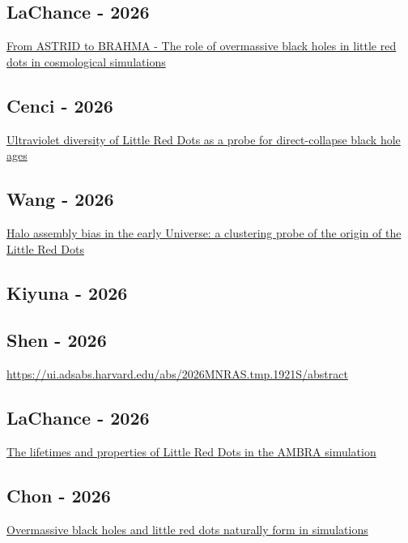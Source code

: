 \documentclass{article}
\begin{document}
\subsection*{LaChance - 2026}
\href{https://ui.adsabs.harvard.edu/abs/2026OJAp....973389L/abstract}{From ASTRID to BRAHMA - The role of overmassive black holes in little red dots in cosmological simulations}

\subsection*{Cenci - 2026}
\href{https://ui.adsabs.harvard.edu/abs/2026OJAp....972764C/abstract}{Ultraviolet diversity of Little Red Dots as a probe for direct-collapse black hole ages}

\subsection*{Wang - 2026}
\href{https://ui.adsabs.harvard.edu/abs/2026MNRAS.552g1712W/abstract}{Halo assembly bias in the early Universe: a clustering probe of the origin of the Little Red Dots}

\subsection*{Kiyuna - 2026}

\subsection*{Shen - 2026}
\href{https://ui.adsabs.harvard.edu/abs/2026MNRAS.tmp.1921S/abstract}{https://ui.adsabs.harvard.edu/abs/2026MNRAS.tmp.1921S/abstract}

\subsection*{LaChance - 2026}
\href{https://ui.adsabs.harvard.edu/abs/2026arXiv260926999L/abstract}{The lifetimes and properties of Little Red Dots in the AMBRA simulation}

\subsection*{Chon - 2026}
\href{https://ui.adsabs.harvard.edu/abs/2026Natur.657..621C/abstract}{Overmassive black holes and little red dots naturally form in simulations}
\end{document}

